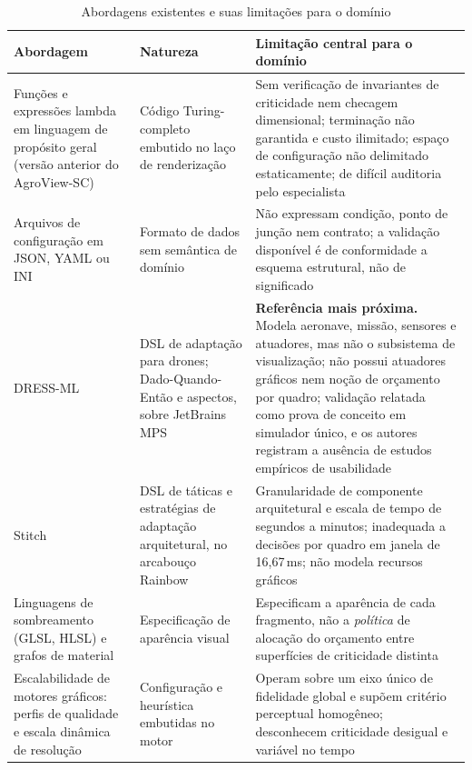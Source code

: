 \documentclass[conference]{IEEEtran}
\begin{document}
\begin{table}[t]
\caption{Abordagens existentes e suas limitações para o domínio}
\label{tab:critica}
\centering
\scriptsize
\setlength{\tabcolsep}{3pt}
\renewcommand{\arraystretch}{0.95}
\begin{tabularx}{\textwidth}{@{}>{\raggedright\arraybackslash}p{}
                               >{\raggedright\arraybackslash}p{}L@{}}
\toprule
\textbf{Abordagem} & \textbf{Natureza} & \textbf{Limitação central para o domínio} \\
\midrule
Funções e expressões lambda em linguagem de propósito geral (versão anterior do
AgroView-SC) &
Código Turing-completo embutido no laço de renderização &
Sem verificação de invariantes de criticidade nem checagem dimensional;
terminação não garantida e custo ilimitado; espaço de configuração não
delimitado estaticamente; de difícil auditoria pelo especialista \\
\addlinespace
Arquivos de configuração em JSON, YAML ou INI &
Formato de dados sem semântica de domínio &
Não expressam condição, ponto de junção nem contrato; a validação disponível é
de conformidade a esquema estrutural, não de significado \\
\addlinespace
DRESS-ML~\cite{alves2022} &
DSL de adaptação para drones; Dado-Quando-Então e aspectos, sobre JetBrains MPS &
\textbf{Referência mais próxima.} Modela aeronave, missão, sensores e atuadores,
mas não o subsistema de visualização; não possui atuadores gráficos nem noção
de orçamento por quadro; validação relatada como prova de conceito em simulador
único, e os autores registram a ausência de estudos empíricos de usabilidade \\
\addlinespace
Stitch~\cite{cheng2012} &
DSL de táticas e estratégias de adaptação arquitetural, no arcabouço Rainbow &
Granularidade de componente arquitetural e escala de tempo de segundos a
minutos; inadequada a decisões por quadro em janela de 16,67\,ms; não modela
recursos gráficos \\
\addlinespace
Linguagens de sombreamento (GLSL, HLSL) e grafos de material &
Especificação de aparência visual &
Especificam a aparência de cada fragmento, não a \textit{política} de alocação
do orçamento entre superfícies de criticidade distinta \\
\addlinespace
Escalabilidade de motores gráficos: perfis de qualidade e escala dinâmica de
resolução &
Configuração e heurística embutidas no motor &
Operam sobre um eixo único de fidelidade global e supõem critério perceptual
homogêneo; desconhecem criticidade desigual e variável no tempo \\

\end{tabularx}
\end{table}
\end{document}
